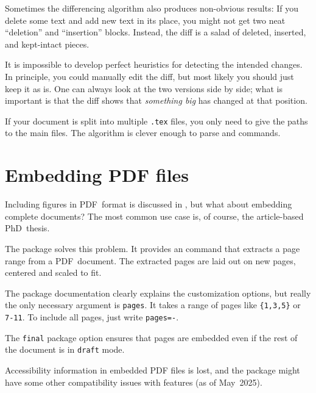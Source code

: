 \begin{gotcha}
Sometimes the differencing algorithm also produces non-obvious results:
If you delete some text and add new text in its place,
you might not get two neat ``deletion'' and ``insertion'' blocks.
Instead, the diff is a salad of deleted, inserted, and kept-intact pieces.

It is impossible to develop perfect heuristics for detecting the intended changes.
In principle, you could manually edit the diff,
but most likely you should just keep it as is.
One can always look at the two versions side by side;
what is important is that the diff shows that \emph{something big} has changed at that position.
\end{gotcha}

If your document is split into multiple \verb|.tex| files,
you only need to give the paths to the main files.
The algorithm is clever enough to parse \verb|| and \verb|| commands.



%
%
%
\section{Embedding PDF files}

Including figures in PDF~format is discussed in ,
but what about embedding complete documents?
The most common use case is, of course, the article-based PhD~thesis.

The  package solves this problem.
It provides an  command that extracts a page range from a PDF~document.
The extracted pages are laid out on new pages,
centered and scaled to fit.

The package documentation clearly explains the customization options,
but really the only necessary argument is \verb|pages|.
It takes a range of pages like \verb|{1,3,5}| or \verb|7-11|.
To include all pages, just write \verb|pages=-|.

\begin{ExampleCode}
\usepackage[final]{pdfpages}


\end{ExampleCode}
%
The \verb|final| package option ensures that pages are embedded
even if the rest of the document is in \verb|draft| mode.

\begin{latexthree}
Accessibility information in embedded PDF files is lost,
and the package might have some other compatibility issues with  features
(as of May~2025).
\end{latexthree}
